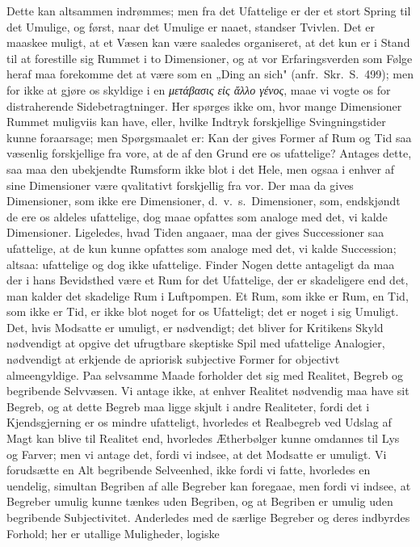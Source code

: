 \documentclass[12pt]{article}
\begin{document}
{Dette kan altsammen indrømmes; men fra det Ufattelige er der et stort
Spring til det Umulige, og først, naar det Umulige er naaet, standser
Tvivlen. Det er maaskee muligt, at et Væsen kan være saaledes
organiseret, at det kun er i Stand til at forestille sig Rummet i to
Dimensioner, og at vor Erfaringsverden som Følge heraf maa forekomme
det at være som en „Ding an sich" (anfr.\ Skr.\ S.\ 499); men for ikke
at gjøre os skyldige i en \textit{μετάβασις εἰς ἄλλο γένος}, maae vi
vogte os for distraherende Sidebetragtninger. Her spørges ikke om,
hvor mange Dimensioner Rummet muligviis kan have, eller, hvilke Indtryk
forskjellige Svingningstider kunne foraarsage; men Spørgsmaalet er: Kan
der gives Former af Rum og Tid saa væsenlig forskjellige fra vore, at
de af den Grund ere os ufattelige? Antages dette, saa maa den
ubekjendte Rumsform ikke blot i det Hele, men ogsaa i enhver af sine
Dimensioner være qvalitativt forskjellig fra vor. Der maa da gives
Dimensioner, som ikke ere Dimensioner, d.\ v.\ s.\ Dimensioner, som,
endskjøndt de ere os aldeles ufattelige, dog maae opfattes som analoge
med det, vi kalde Dimensioner. Ligeledes, hvad Tiden angaaer, maa der
gives Successioner saa ufattelige,
at de kun kunne opfattes som analoge med det, vi kalde Succession;
altsaa: ufattelige og dog ikke ufattelige. Finder Nogen dette
antageligt da maa der i hans Bevidsthed være et Rum for det Ufattelige,
der er skadeligere end det, man kalder det skadelige Rum i Luftpompen.
Et Rum, som ikke er Rum, en Tid, som ikke er Tid, er ikke blot noget
for os Ufatteligt; det er noget i sig Umuligt. Det, hvis Modsatte er
umuligt, er nødvendigt; det bliver for Kritikens Skyld nødvendigt at
opgive det ufrugtbare skeptiske Spil med ufattelige Analogier,
nødvendigt at erkjende de apriorisk subjective Former for objectivt
almeengyldige. Paa selvsamme Maade forholder det sig med Realitet,
Begreb og begribende Selvvæsen. Vi antage ikke, at enhver Realitet
nødvendig maa have sit Begreb, og at dette Begreb maa ligge skjult i
andre Realiteter, fordi det i Kjendsgjerning er os mindre ufatteligt,
hvorledes et Realbegreb ved Udslag af Magt kan blive til Realitet end,
hvorledes Ætherbølger kunne omdannes til Lys og Farver; men vi antage
det, fordi vi indsee, at det Modsatte er umuligt. Vi forudsætte en Alt
begribende Selveenhed, ikke fordi vi fatte, hvorledes en uendelig,
simultan Begriben af alle Begreber kan foregaae, men fordi vi indsee,
at Begreber umulig kunne tænkes uden Begriben, og at Begriben er umulig
uden begribende Subjectivitet. Anderledes med de særlige Begreber og
deres indbyrdes Forhold; her er utallige Muligheder, logiske
}
\end{document}
